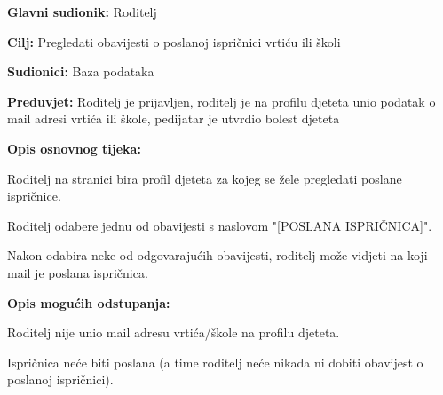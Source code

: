 					
					\noindent {}
					\begin{packed_item}
						
						\item \textbf{Glavni sudionik: }Roditelj
						\item  \textbf{Cilj:} Pregledati obavijesti o poslanoj ispričnici vrtiću ili školi
						\item  \textbf{Sudionici:} Baza podataka
						\item  \textbf{Preduvjet:} Roditelj je prijavljen, roditelj je na profilu djeteta unio podatak o mail adresi vrtića ili škole, pedijatar je utvrdio bolest djeteta
						\item  \textbf{Opis osnovnog tijeka:}
						
						\item[] \begin{packed_enum}
							
							\item Roditelj na stranici bira profil djeteta za kojeg se žele pregledati poslane ispričnice.
							\item Roditelj odabere jednu od obavijesti s naslovom "[POSLANA ISPRIČNICA]".
							\item Nakon odabira neke od odgovarajućih obavijesti, roditelj može vidjeti na koji mail je poslana ispričnica.
						\end{packed_enum}
						\item  \textbf{Opis mogućih odstupanja:}
						
						\item[] \begin{packed_item}
							
							\item[2.a] Roditelj nije unio mail adresu vrtića/škole na profilu djeteta.
							\item[] \begin{packed_enum}
								
								\item Ispričnica neće biti poslana (a time roditelj neće nikada ni dobiti obavijest o poslanoj ispričnici).
							\end{packed_enum}
							
							
						\end{packed_item}
						
					\end{packed_item}
					
